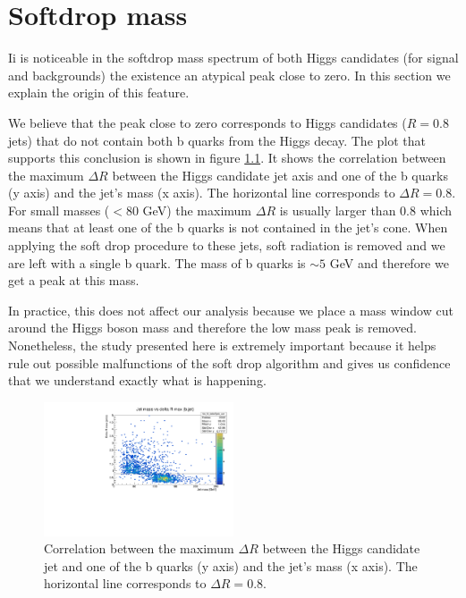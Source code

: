 
\chapter{Softdrop mass}
\label{chapter:SDmass}

Ii is noticeable in the softdrop mass spectrum of both Higgs candidates (for signal and backgrounds) the existence an atypical peak close to zero. In this section we explain the origin of this feature.

We believe that the peak close to zero corresponds to Higgs candidates ($R=0.8$ jets) that do not contain both b quarks from the Higgs decay. The plot that supports this conclusion is shown in figure \ref{fig:SDmass_peak}. It shows the correlation between the maximum $\Delta R$ between the Higgs candidate jet axis and one of the b quarks (y axis) and the jet's mass (x axis). The horizontal line corresponds to $\Delta R=0.8$. For small masses ($<80$ GeV) the maximum $\Delta R$ is usually larger than $0.8$ which means that at least one of the b quarks is not contained in the jet's cone. When applying the soft drop procedure to these jets, soft radiation is removed and we are left with a single b quark. The mass of b quarks is $\sim5$ GeV and therefore we get a peak at this mass.

In practice, this does not affect our analysis because we place a mass window cut around the Higgs boson mass and therefore the low mass peak is removed. Nonetheless, the study presented here is extremely important because it helps rule out possible malfunctions of the soft drop algorithm and gives us confidence that we understand exactly what is happening. 

\begin{figure}
	\centering
	\includegraphics[width=0.5\textwidth]{./Figures/hist_M_deltaRmax_jetb_corr.pdf}
	\caption{Correlation between the maximum $\Delta R$ between the Higgs candidate jet and one of the b quarks (y axis) and the jet's mass (x axis). The horizontal line corresponds to $\Delta R=0.8$.}
	\label{fig:SDmass_peak}
\end{figure}
